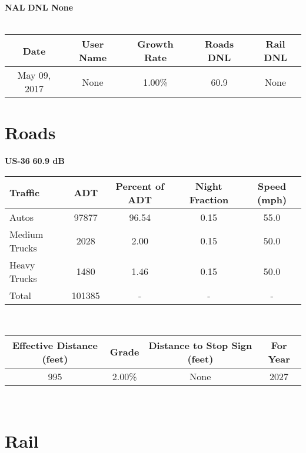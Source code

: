 \documentclass{article}%
\begin{document}
%
\normalsize%
\noindent \textbf{ \noindent \Large NAL }%
\hfill%
\textbf{\large DNL None}%
\\ \\%
\begin{tabular}{c|c|c|c|c}%
\hline%
Date&User Name&Growth Rate&Roads DNL&Rail DNL\\%
\hline%
May 09, 2017&None&1.00\%&60.9&None\\%
\end{tabular}%
\section*{Roads}%

%
\textbf{US{-}36}%
\hfill%
\textbf{60.9 dB}%
\\%
\begin{tabular}{lcccc}%
\hline%
Traffic&ADT&Percent of ADT&Night Fraction&Speed (mph)\\%
\hline%
Autos&97877&96.54&0.15&55.0\\%
Medium Trucks&2028&2.00&0.15&50.0\\%
Heavy Trucks&1480&1.46&0.15&50.0\\%
Total&101385&{-}&{-}&{-}\\%
\hline%
\end{tabular}%
\\%
\begin{tabular}{cccc}%
Effective Distance (feet)&Grade&Distance to Stop Sign (feet)&For Year\\%
\hline%
995&2.00\%&None&2027\\%
\end{tabular}%
\vspace{.25in}%
\\%
\vspace{-.25in}%
\section*{Rail}%

%
\end{document}
